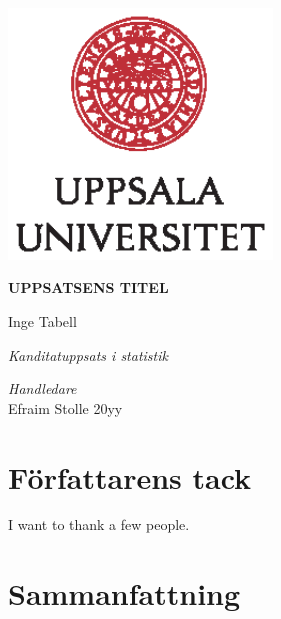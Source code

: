 \documentclass[a4paper,11pt]{article}
\renewcommand{\baselinestretch}{1.5}
\begin{document}
\thispagestyle{empty}
\begin{center}
\includegraphics[width=7cm]{UU_logo_CMYK.eps}
\end{center}
\vspace{1.5cm}
\begin{center}
\begin{Large}
{\bf UPPSATSENS TITEL}
\end{Large}
\end{center}
\vskip1.5cm
\renewcommand{\baselinestretch}{1}
\begin{center}
{\large Inge Tabell}
\vskip2.5cm
\begin{center}
\begin{large}
{\it Kanditatuppsats i statistik}\\
\end{large}
\end{center}
\vskip2cm
{\large\it Handledare}\\
{\large Efraim Stolle}
\vskip2cm
{\large 20yy}
\end{center}\vfill

\newpage
\hypertarget{fuxf6rfattarens-tack}{%
\section*{Författarens tack}\label{fuxf6rfattarens-tack}}

I want to thank a few people.
\pagestyle{plain}
\setcounter{page}{1}    %

\newpage
\hypertarget{sammanfattning}{%
\section*{Sammanfattning}\label{sammanfattning}}
\end{document}
